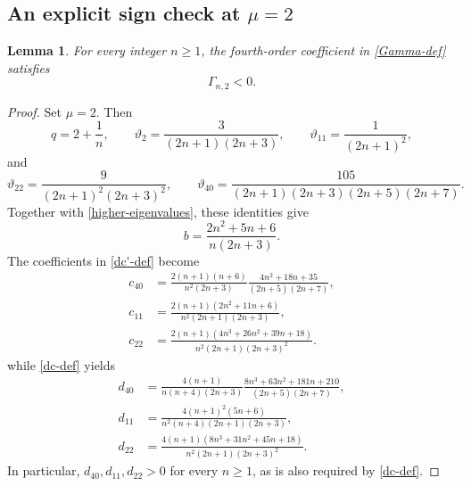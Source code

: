 \documentclass[10pt,a4paper]{amsart}
\newtheorem{lemma}{Lemma}[section]
\begin{document}
\subsection{\texorpdfstring{{An explicit sign check at $\mu=2$}}{An explicit sign check at mu=2}}
\begin{lemma}\label{Gamma-mu-two}
For every integer $n\ge1$, the fourth-order coefficient in \eqref{Gamma-def} satisfies
\[
 \Gamma_{n,2}<0.
\]
\end{lemma}
\begin{proof}
Set $\mu=2$. Then
\[
 q=2+\frac1n,
 \qquad
 \vartheta_2=\frac{3}{(2n+1)(2n+3)},
 \qquad
 \vartheta_{11}=\frac{1}{(2n+1)^2},
\]
and
\[
 \vartheta_{22}=\frac{9}{(2n+1)^2(2n+3)^2},
 \qquad
 \vartheta_{40}=\frac{105}{(2n+1)(2n+3)(2n+5)(2n+7)}.
\]
Together with \eqref{higher-eigenvalues}, these identities give
\begin{equation}\label{Gamma2-b}
 b=\frac{2n^2+5n+6}{n(2n+3)}.
\end{equation}
The coefficients in \eqref{dc'-def} become
\begin{equation}\label{Gamma2-c}
\begin{aligned}
 c_{40}&=\frac{2(n+1)(n+6)}{n^2(2n+3)}
 \frac{4n^2+18n+35}{(2n+5)(2n+7)},\\
 c_{11}&=\frac{2(n+1)(2n^2+11n+6)}
 {n^2(2n+1)(2n+3)},\\
 c_{22}&=\frac{2(n+1)(4n^3+26n^2+39n+18)}
 {n^2(2n+1)(2n+3)^2}.
\end{aligned}
\end{equation}
while \eqref{dc-def} yields
\begin{equation}\label{Gamma2-d}
\begin{aligned}
 d_{40}&=\frac{4(n+1)}{n(n+4)(2n+3)}
 \frac{8n^3+63n^2+181n+210}{(2n+5)(2n+7)},\\
 d_{11}&=\frac{4(n+1)^2(5n+6)}
 {n^2(n+4)(2n+1)(2n+3)},\\
 d_{22}&=\frac{4(n+1)(8n^3+31n^2+45n+18)}
 {n^2(2n+1)(2n+3)^2}.
\end{aligned}
\end{equation}
In particular, $d_{40},d_{11},d_{22}>0$ for every $n\ge1$, as is also required by \eqref{dc-def}.


\end{proof}
\end{document}
